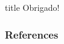 \documentclass[svgnames,smaller,table]{beamer}
\begin{document}
\begin{frame}
 \vfill
  \begin{beamercolorbox}[center]{title}
     \Huge{Obrigado!}
  \end{beamercolorbox}
  \vfill
\end{frame}

\begin{frame}
    \frametitle{References}
    
    
\end{frame}
\end{document}
